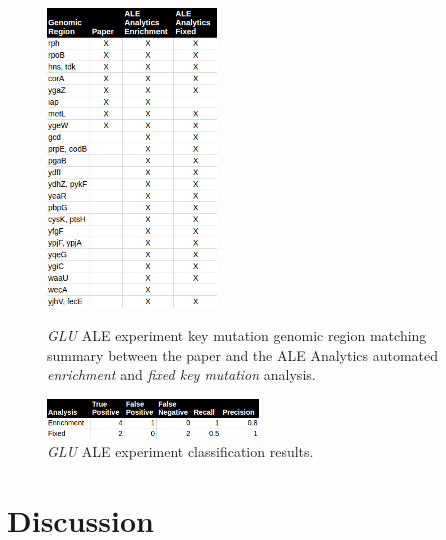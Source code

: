 \documentclass[12pt,final,masters,chapterheads]{ucsd}  %
\begin{document}
\begin{figure}[H]
  \caption{\textit{GLU} ALE experiment {key mutation} genomic region matching summary between the paper and the ALE Analytics automated \textit{enrichment} and \textit{fixed key mutation} analysis.}
  \centering
  \includegraphics[width=0.4\textwidth]{glu_key_mutation_regions.png}
  \label{fig:}
\end{figure}
\begin{figure}[H]
  \centering
   \caption{\textit{GLU} ALE experiment classification results.}
  \includegraphics[width=0.5\textwidth]{c13_precision_recall.png}
\end{figure}

\chapter{Discussion}
%
%
%
%
%
%
%
%
%
%
\end{document}
